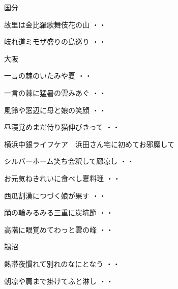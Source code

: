 \vspace{0.6cm}
国分
\begin{shiika}故里は金比羅歌舞伎花の山
\hfill{・・}\end{shiika}
\begin{shiika}岐れ道ミモザ盛りの島巡り
\hfill{・・}\end{shiika}
\vspace{0.6cm}
大阪
\begin{shiika}一言の棘のいたみや夏
\hfill{・・}\end{shiika}
\begin{shiika}一言の棘に猛暑の雲みあぐ
\hfill{・・}\end{shiika}
\begin{shiika}風鈴や窓辺に母と娘の笑顔
\hfill{・・}\end{shiika}
\begin{shiika}昼寝覚めまだ侍り猫伸びきって
\hfill{・・}\end{shiika}
\vspace{0.6cm}
横浜中銀ライフケア　浜田さん宅に初めてお邪魔して
\begin{shiika}シルバーホーム笑ち会釈して廊凉し
\hfill{・・}\end{shiika}
\begin{shiika}お元気ねきれいに食べし夏料理
\hfill{・・}\end{shiika}
\begin{shiika}西瓜割漢につづく娘が果す
\hfill{・・}\end{shiika}
\begin{shiika}踊の輪みるみる三重に炭坑節
\hfill{・・}\end{shiika}
\begin{shiika}高階に眼覚めてわっと雲の峰
\hfill{・・}\end{shiika}
\vspace{0.6cm}
鵠沼
\begin{shiika}熱帯夜慣れて別れのなにとなう
\hfill{・・}\end{shiika}
\begin{shiika}朝凉や肩まで掛けてふと淋し
\hfill{・・}\end{shiika}
